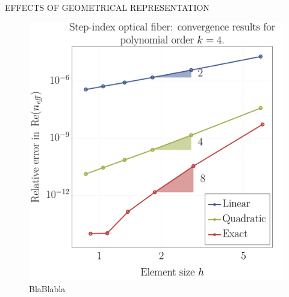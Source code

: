 \documentclass[final]{beamer} %
\begin{document}
\begin{frame}
\begin{columns}
\begin{column}{0.45\textwidth}
{\begin{block}{\boxnumber EFFECTS OF GEOMETRICAL REPRESENTATION}
\begin{figure}[ht]
            \includegraphics[width=0.8\linewidth]{images/convergenceRates_k4_poster.png}
            \caption{BlaBlabla}
            \label{fig:test}
        \end{figure}
        

\end{block}}
\end{column}
\end{columns}
\end{frame}
\end{document}
